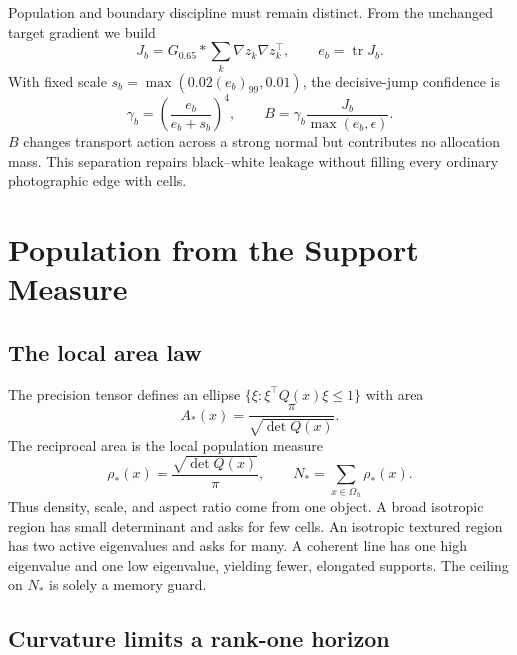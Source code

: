 \documentclass[11pt,letterpaper]{article}
\newcommand{\OmegaD}{\Omega_h}
\newcommand{\tr}{\operatorname{tr}}
\begin{document}
Population and boundary discipline must remain distinct. From the unchanged target
gradient we build
\begin{equation}
J_b=G_{0.65}*\sum_k\nabla z_k\nabla z_k^\top,\qquad e_b=\tr J_b.
\end{equation}
With fixed scale \(s_b=\max(0.02(e_b)_{99},0.01)\), the decisive-jump confidence is
\begin{equation}
\gamma_b=\left(\frac{e_b}{e_b+s_b}\right)^4,\qquad
B=\gamma_b\frac{J_b}{\max(e_b,\epsilon)}.
\label{eq:jump}
\end{equation}
\(B\) changes transport action across a strong normal but contributes no allocation
mass. This separation repairs black--white leakage without filling every ordinary
photographic edge with cells.

\section{Population from the Support Measure}
\label{sec:population}

\subsection{The local area law}

The precision tensor defines an ellipse
\(\{\xi:\xi^\top Q(x)\xi\le 1\}\) with area
\begin{equation}
A_*(x)=\frac{\pi}{\sqrt{\det Q(x)}}.
\end{equation}
The reciprocal area is the local population measure
\begin{equation}
\rho_*(x)=\frac{\sqrt{\det Q(x)}}{\pi},\qquad
N_*=\sum_{x\in\OmegaD}\rho_*(x).
\label{eq:measure}
\end{equation}
Thus density, scale, and aspect ratio come from one object. A broad isotropic region has
small determinant and asks for few cells. An isotropic textured region has two active
eigenvalues and asks for many. A coherent line has one high eigenvalue and one low
eigenvalue, yielding fewer, elongated supports. The ceiling on \(N_*\) is solely a
memory guard.

\subsection{Curvature limits a rank-one horizon}
\label{sec:curvature}
\end{document}
